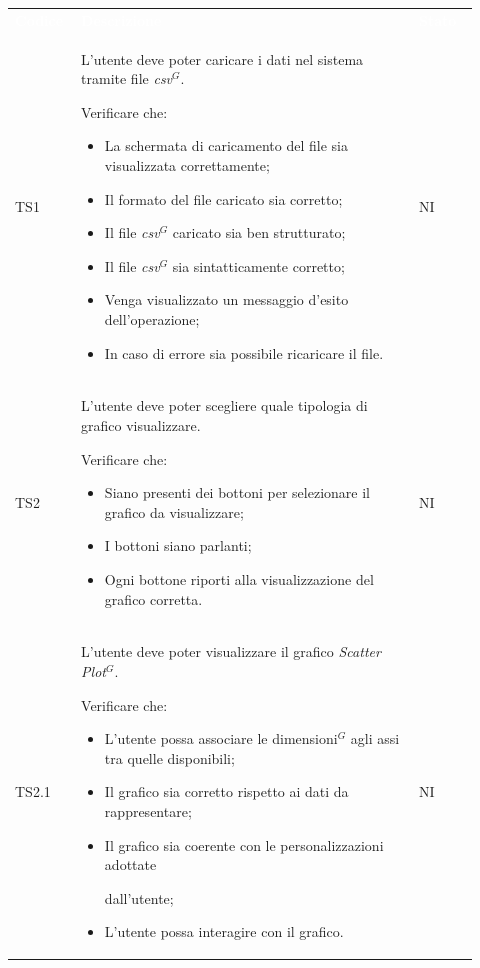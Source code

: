 \renewcommand{\arraystretch}{1.5}
\begin{longtable}{p{0.12\linewidth}p{0.68\linewidth}p{0.12\linewidth}}
	\rowcolor[RGB]{33, 73, 50}
	\textcolor{white}{\textbf{Codice}} & \textcolor{white}{\textbf{Descrizione}} & \textcolor{white}{\textbf{Stato}}\\
    
    \rowcolor[RGB]{233, 245, 206}
    TS1 & 
    L'utente deve poter caricare i dati nel sistema tramite file \textit{csv}$^{G}$. \par Verificare che: 
    \begin{itemize}
        \item La schermata di caricamento del file sia visualizzata correttamente;
        \item Il formato del file caricato sia corretto;
        \item Il file \textit{csv}$^{G}$ caricato sia ben strutturato;
        \item Il file \textit{csv}$^{G}$ sia sintatticamente corretto;
        \item Venga visualizzato un messaggio d'esito dell'operazione; 
        \item In caso di errore sia possibile ricaricare il file.
    \end{itemize}&
    NI \\

    \rowcolor[RGB]{216, 235, 171}
    TS2 &
    L'utente deve poter scegliere quale tipologia di grafico visualizzare. \par Verificare che:
    \begin{itemize}
        \item Siano presenti dei bottoni per selezionare il grafico da visualizzare;
        \item I bottoni siano parlanti;
        \item Ogni bottone riporti alla visualizzazione del grafico corretta.
    \end{itemize}&
    NI\\

    \rowcolor[RGB]{233, 245, 206}
    TS2.1 & 
    L'utente deve poter visualizzare il grafico \textit{Scatter Plot}$^{G}$. 
    \par Verificare che: 
    \begin{itemize}
        \item L'utente possa associare le dimensioni$^{G}$ agli assi tra quelle disponibili;
        \item Il grafico sia corretto rispetto ai dati da rappresentare;
        \item Il grafico sia coerente con le personalizzazioni adottate \par dall'utente;
        \item L'utente possa interagire con il grafico.
    \end{itemize}&
    NI\\


\end{longtable}
